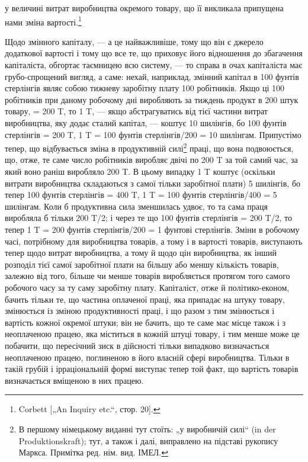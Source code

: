 у величині витрат виробництва окремого товару, що її викликала припущена нами зміна вартості.\footnote{
Corbett [„An Inquiry etc.“, стор. 20].
}

Щодо змінного капіталу, — а це найважливіше, тому що він
є джерело додаткової вартості і тому що все те, що приховує
його відношення до збагачення капіталіста, обгортає таємницею
всю систему, — то справа в очах капіталіста має грубо-спрощений вигляд, а саме: нехай, наприклад,
змінний капітал в 100 фунтів стерлінгів являє собою тижневу заробітну плату 100 робітників. Якщо ці
100 робітників при даному робочому дні виробляють за тиждень продукт в 200 штук товару, = 200 T, то
1 T, — якщо абстрагуватись від тієї частини витрат виробництва,
яку додає сталий капітал, — коштує 10 шилінгів, бо 100 фунтів стерлінгів = 200 T, 1 T = 100 фунтів
стерлінгів/200 = 10 шилінгам. Припустімо тепер, що відбувається зміна в продуктивній силі\footnote*{
В першому німецькому виданні тут стоїть: „у виробничій силі“ (in der
Produktionskraft); тут, а також і далі, виправлено на підставі рукопису Маркса.
Примітка ред. нім. вид. ІМЕЛ.
} праці,
що вона подвоюється, що, отже, те саме число робітників виробляє двічі по 200 T за той самий час, за
який воно раніш
виробляло 200 T. В цьому випадку 1 T коштує (оскільки витрати виробництва складаються з самої тільки
заробітної плати)
5 шилінгів, бо тепер 100 фунтів стерлінгів = 400 T, 1 T = 100 фунтів стерлінгів/400 = 5 шилінгам.
Коли б продуктивна сила
зменшилась удвоє, то та сама праця виробляла б тільки 200 T/2; і через те що 100 фунтів стерлінгів =
200 T/2, то тепер 1 T = 200 фунтів стерлінгів/200 = 1 фунтові стерлінгів. Зміни в робочому
часі, потрібному для виробництва товарів, а тому і в вартості
товарів, виступають тепер щодо витрат виробництва, а тому
й щодо цін виробництва, як інший розподіл тієї самої заробітної
плати на більшу або меншу кількість товарів, залежно від того,
більше чи менше товарів виробляється протягом того самого
робочого часу за ту саму заробітну плату. Капіталіст, отже
й політико-економ, бачить тільки те, що частина оплаченої праці,
яка припадає на штуку товару, змінюється із зміною продуктивності праці, і
що разом з тим змінюється і вартість кожної
окремої штуки; він не бачить, що те саме має місце також і з неоплаченою працею, яка міститься в
кожній штуці товару, і тим
менше може це побачити, що пересічний зиск в дійсності тільки
випадково визначається неоплаченою працею, поглиненою в його
власній сфері виробництва. Тільки в такій грубій і ірраціональній
формі виступає тепер той факт, що вартість товарів визначається вміщеною в них працею.